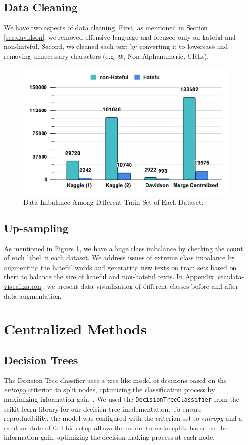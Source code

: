 \documentclass[11pt]{article}
\begin{document}
\subsection{Data Cleaning} We have two aspects of data cleaning. First, as mentioned in Section \ref{sec:davidson}, we removed offensive language and focused only on hateful and non-hateful. Second, we cleaned each text by converting it to lowercase and removing unnecessary characters (e.g. @, Non-Alphanumeric, URLs). 

\begin{figure}[t]
    \centering
    \includegraphics[width=.5\textwidth]{images/data-imbalance.pdf}
    \caption{Data Imbalance Among Different Train Set of Each Dataset.}
    \label{fig:data-imbalance}
\end{figure}

\subsection{Up-sampling} 
As mentioned in Figure \ref{fig:data-imbalance}, we have a huge class imbalance by checking the count of each label in each dataset. 
We address issues of extreme class imbalance by augmenting the hateful words and generating new texts on train sets based on them to balance the size of hateful and non-hateful texts. In Appendix \ref{sec:data-visualization}, we present data visualization of different classes before and after data augmentation.


\section{Centralized Methods}

\subsection{Decision Trees}
The Decision Tree classifier uses a tree-like model of decisions based on the \textit{entropy} criterion to split nodes, optimizing the classification process by maximizing information gain~\cite{song2015decision}. We used the \texttt{DecisionTreeClassifier} from the scikit-learn library for our decision tree implementation. To ensure reproducibility, the model was configured with the criterion set to \textit{entropy} and a random state of $0$. This setup allows the model to make splits based on the information gain, optimizing the decision-making process at each node.
\end{document}
